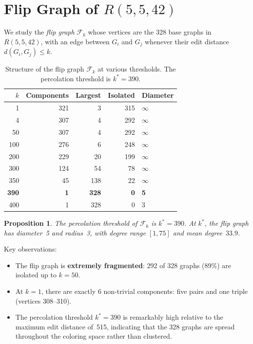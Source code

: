 \documentclass[11pt,a4paper]{article}
\newtheorem{proposition}[theorem]{Proposition}
\theoremstyle{definition}
\theoremstyle{remark}
\newcommand{\Rset}[3]{R(#1,#2,#3)}
\begin{document}
\section{Flip Graph of $\Rset{5}{5}{42}$}
\label{sec:flip}

We study the \emph{flip graph} $\mathcal{F}_k$ whose vertices
are the 328 base graphs in $\Rset{5}{5}{42}$, with an edge
between $G_i$ and $G_j$ whenever their edit distance
$d(G_i, G_j) \leq k$.

\begin{table}[h]
\centering
\begin{tabular}{rrrrl}
\toprule
$k$ & \textbf{Components} & \textbf{Largest} & \textbf{Isolated} & \textbf{Diameter} \\
\midrule
  1 & 321 &   3 & 315 & $\infty$ \\
  4 & 307 &   4 & 292 & $\infty$ \\
 50 & 307 &   4 & 292 & $\infty$ \\
100 & 276 &   6 & 248 & $\infty$ \\
200 & 229 &  20 & 199 & $\infty$ \\
300 & 124 &  54 &  78 & $\infty$ \\
350 &  45 & 138 &  22 & $\infty$ \\
\textbf{390} & \textbf{1} & \textbf{328} & \textbf{0} & \textbf{5} \\
400 &   1 & 328 &   0 &  3 \\
\bottomrule
\end{tabular}
\caption{Structure of the flip graph $\mathcal{F}_k$ at
various thresholds.  The percolation threshold is $k^* = 390$.}
\label{tab:flip}
\end{table}

\begin{proposition}
The percolation threshold of $\mathcal{F}_k$ is $k^* = 390$.
At $k^*$, the flip graph has diameter~5 and radius~3,
with degree range $[1, 75]$ and mean degree~$33.9$.
\end{proposition}

Key observations:
\begin{itemize}
  \item The flip graph is \textbf{extremely fragmented}:
    292 of 328 graphs (89\%) are isolated up to $k = 50$.
  \item At $k = 1$, there are exactly 6 non-trivial components:
    five pairs and one triple (vertices 308--310).
  \item The percolation threshold $k^* = 390$ is remarkably
    high relative to the maximum edit distance of~515,
    indicating that the 328 graphs are spread throughout
    the coloring space rather than clustered.
\end{itemize}
\end{document}

